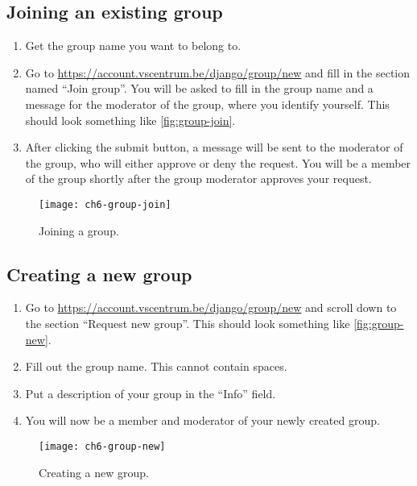 \begin{prompt}
\end{prompt}

\subsection{Joining an existing group}

\begin{enumerate}
    \item Get the group name you want to belong to.
    \item Go to \url{https://account.vscentrum.be/django/group/new} and fill in the
        section named ``Join group''. You will be asked to fill in the group name and a message for
        the moderator of the group, where you identify yourself. This should look something
        like \autoref{fig:group-join}.
    \item After clicking the submit button, a message will be sent to the moderator
        of the group, who will either approve or deny the request. You will be a member of the
        group shortly after the group moderator approves your request.
\end{enumerate}

\begin{figure}[!htbp]
  \caption{Joining a group.}
  \centering
    \texttt{[image: ch6-group-join]}
\end{figure}\label{fig:group-join}

\subsection{Creating a new group}

\begin{enumerate}
    \item Go to \url{https://account.vscentrum.be/django/group/new} and scroll down
        to the section ``Request new group''. This should look something like
        \autoref{fig:group-new}.
    \item Fill out the group name. This cannot contain spaces.
    \item Put a description of your group in the ``Info'' field.
    \item You will now be a member and moderator of your newly created group.
\end{enumerate}

\begin{figure}[!htbp]
  \caption{Creating a new group.}
  \centering
    \texttt{[image: ch6-group-new]}
\end{figure}\label{fig:group-new}

